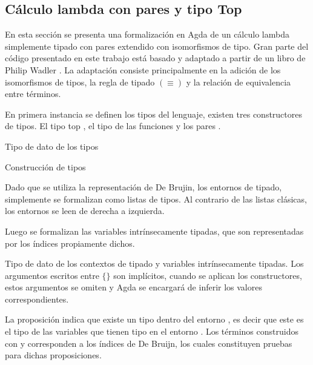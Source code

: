 \subsection{Cálculo lambda con pares y tipo Top}

En esta sección se presenta una formalización en Agda de un cálculo lambda simplemente tipado con pares extendido con isomorfismos de tipo.
Gran parte del código presentado en este trabajo está basado y adaptado a partir de un libro de Philip Wadler \cite{plfa}.
La adaptación consiste principalmente en la adición de los isomorfismos de tipos, la regla de tipado $(\equiv)$ y la relación de equivalencia entre términos.

En primera instancia se definen los tipos del lenguaje, existen tres constructores de tipos.
El tipo top \const{$\top$}, el tipo de las funciones \const{$\_\Rightarrow\_$} y los pares \const{$\_\times\_$}.

\begin{codigo}
	Tipo de dato de los tipos
	
\end{codigo}

\begin{example}
	Construcción de tipos
\end{example}

Dado que se utiliza la representación de De Brujin, los entornos de tipado, simplemente se formalizan como listas de tipos.
Al contrario de las listas clásicas, los entornos se leen de derecha a izquierda.

Luego se formalizan las variables intrínsecamente tipadas, que son representadas por los índices propiamente dichos.

\begin{codigo}
	Tipo de dato de los contextos de tipado y variables intrínsecamente tipadas.
	Los argumentos escritos entre $\{\}$ son implícitos, cuando se aplican los constructores, estos argumentos se omiten y Agda se encargará de inferir los valores correspondientes.
\end{codigo}

La proposición \bound{$\Gamma$} \const{$\ni$}  indica que existe un tipo  dentro del entorno \bound{$\Gamma$}, es decir que este es el tipo de las variables que tienen tipo  en el entorno \bound{$\Gamma$}.
Los términos construidos con  y  corresponden a los índices de De Bruijn, los cuales constituyen pruebas para dichas proposiciones.

